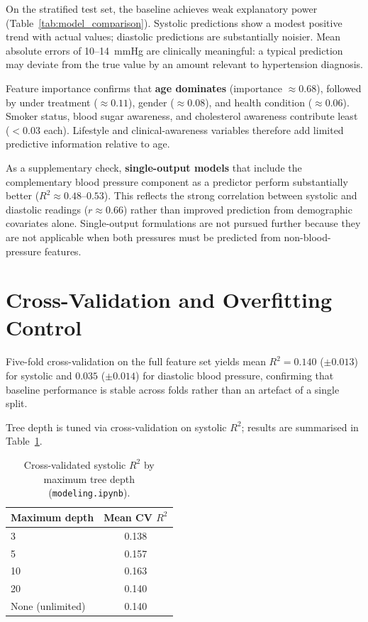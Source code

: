 On the stratified test set, the baseline achieves weak explanatory power (Table~\ref{tab:model_comparison}). Systolic predictions show a modest positive trend with actual values; diastolic predictions are substantially noisier. Mean absolute errors of 10--14~mmHg are clinically meaningful: a typical prediction may deviate from the true value by an amount relevant to hypertension diagnosis.

Feature importance confirms that \textbf{age dominates} (importance $\approx 0.68$), followed by under treatment ($\approx 0.11$), gender ($\approx 0.08$), and health condition ($\approx 0.06$). Smoker status, blood sugar awareness, and cholesterol awareness contribute least ($< 0.03$ each). Lifestyle and clinical-awareness variables therefore add limited predictive information relative to age.

As a supplementary check, \textbf{single-output models} that include the complementary blood pressure component as a predictor perform substantially better ($R^2 \approx 0.48$--$0.53$). This reflects the strong correlation between systolic and diastolic readings ($r \approx 0.66$) rather than improved prediction from demographic covariates alone. Single-output formulations are not pursued further because they are not applicable when both pressures must be predicted from non-blood-pressure features.

\section{Cross-Validation and Overfitting Control}
\label{sec:modelling_cv}

Five-fold cross-validation on the full feature set yields mean $R^2 = 0.140$ ($\pm 0.013$) for systolic and $0.035$ ($\pm 0.014$) for diastolic blood pressure, confirming that baseline performance is stable across folds rather than an artefact of a single split.

Tree depth is tuned via cross-validation on systolic $R^2$; results are summarised in Table~\ref{tab:depth_tuning}.

\begin{table}[h]
    \centering
    \caption{Cross-validated systolic $R^2$ by maximum tree depth (\texttt{modeling.ipynb}).}
    \label{tab:depth_tuning}
    \begin{tabular}{lc}
        \toprule
        \textbf{Maximum depth} & \textbf{Mean CV $R^2$} \\
        \midrule
        3  & 0.138 \\
        5  & 0.157 \\
        10 & 0.163 \\
        20 & 0.140 \\
        None (unlimited) & 0.140 \\
        \bottomrule
    \end{tabular}
\end{table}

